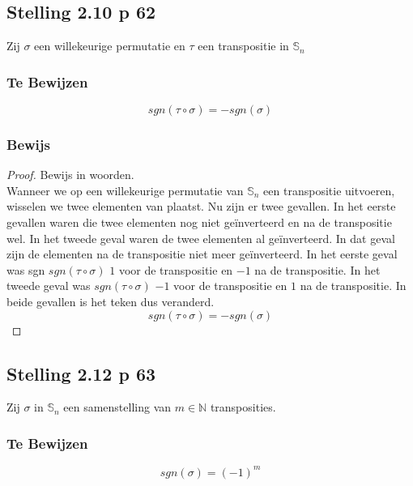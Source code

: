 \documentclass[lineaire_algebra_oplossingen.tex]{subfiles}
\begin{document}
\subsection{Stelling 2.10 p 62}
\label{2.10}
Zij $\sigma$ een willekeurige permutatie en $\tau$ een transpositie in $\mathbb{S}_n$

\subsubsection*{Te Bewijzen}
\[
sgn(\tau \circ \sigma) = - sgn(\sigma)
\]

\subsubsection*{Bewijs}
\begin{proof}
Bewijs in woorden.\\
Wanneer we op een willekeurige permutatie van $\mathbb{S}_n$ een transpositie uitvoeren, wisselen we twee elementen van plaatst. Nu zijn er twee gevallen. In het eerste gevallen waren die twee elementen nog niet ge\"inverteerd en na de transpositie wel. In het tweede geval waren de twee elementen al ge\"inverteerd. In dat geval zijn de elementen na de transpositie niet meer ge\"inverteerd. In het eerste geval was sgn $sgn(\tau \circ \sigma)$ $1$ voor de transpositie en $-1$ na de transpositie. In het tweede geval was $sgn(\tau \circ \sigma)$ $-1$ voor de transpositie en $1$ na de transpositie. In beide gevallen is het teken dus veranderd.
\[
sgn(\tau \circ \sigma) = - sgn(\sigma)
\]
\end{proof}


\subsection{Stelling 2.12 p 63}
\label{2.12}
Zij $\sigma$ in $\mathbb{S}_n$ een samenstelling van $m \in \mathbb{N}$ transposities.

\subsubsection*{Te Bewijzen}
\[
sgn(\sigma) = (-1)^{m}
\]
\end{document}
